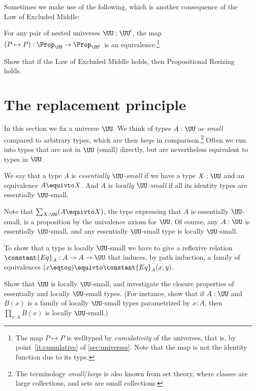 Sometimes we make use of the following,
which is another consequence of the Law of Excluded Middle:
\begin{principle}
  \label{pri:prop-resizing}
  For any pair of nested universes $\UU:\UU'$, the map
  $(P\mapsto P):\Prop_\UU \to \Prop_{\UU'}$ is an equivalence.\footnote%
  {The map $P\mapsto P$ is welltyped by \emph{cumulativity}
  of the universes, that is, by point~\ref{it:cumulative}
  of \cref{sec:universes}. Note that the map is not
  the identity function due to its type.}
\end{principle}
\begin{xca}\label{xca:lem-prop-sizing}
  Show that if the Law of Excluded Middle holds,
  then Propositional Resizing holds.
\end{xca}


\section{The replacement principle}
\label{sec:replacement}

In this section we fix a universe $\UU$.
We think of types $A:\UU$ as \emph{small} compared to arbitrary types,
which are then \emph{large} in comparison.\footnote{%
  The terminology \emph{small}/\emph{large} is also known from set theory,
  where classes are large collections,
  and sets are small collections.}
Often we run into types that are not in $\UU$ (small) directly,
but are nevertheless equivalent to types in $\UU$.
\begin{definition}\label{def:ess-loc-small}
  We say that a type $A$ is \emph{essentially $\UU$-small} if we
  have a type $X:\UU$ and an equivalence $A \equivto
  X$. And $A$ is \emph{locally $\UU$-small} if all its identity types
  are essentially $\UU$-small.
\end{definition}
Note that $\sum_{X:\UU}(A \equivto X)$, the type expressing that
$A$ is essentially $\UU$-small, is a proposition by the
univalence axiom for $\UU$.
Of course, any $A:\UU$ is essentially $\UU$-small,
and any essentially $\UU$-small type is locally $\UU$-small.

To show that a type is locally $\UU$-small
we have to give a reflexive relation
$\constant{Eq}_A : A \to A \to \UU$
that induces, by path induction, a family of equivalences
$(x \eqto y) \equivto \constant{Eq}_A(x,y)$.

\begin{xca}
  Show that $\UU$ is locally $\UU$-small, and investigate
  the closure properties of essentially and locally $\UU$-small types.
  (For instance, show that if $A:\UU$ and $B(x)$ is a family of locally $\UU$-small
  types parametrized by $x:A$, then $\prod_{x:A}B(x)$ is locally $\UU$-small.)
\end{xca}

